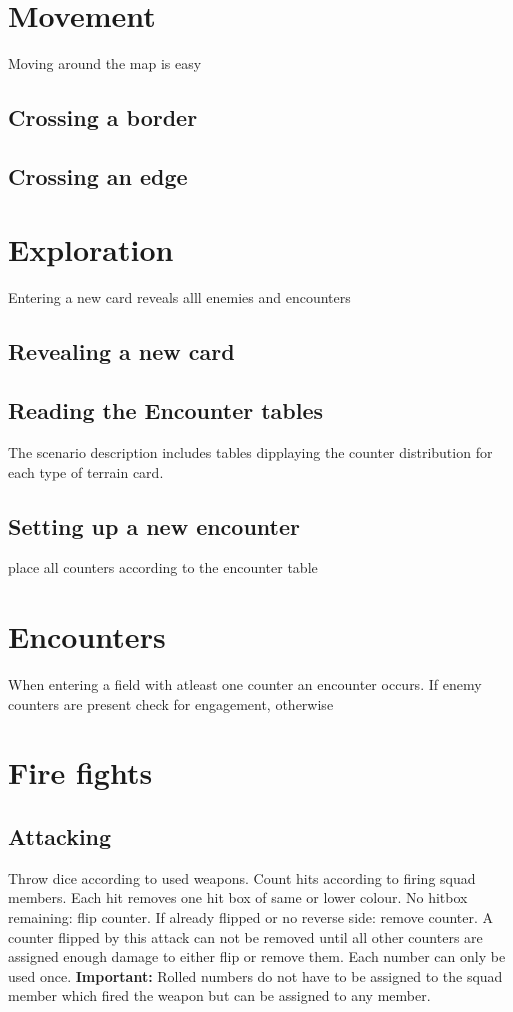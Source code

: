 \documentclass[twocolumn,titlepage]{article}
\begin{document}
\section{Movement}
Moving around the map is easy
\subsection{Crossing a border}
\subsection{Crossing an edge}
\section{Exploration}
Entering a new card reveals alll enemies and encounters
\subsection{Revealing a new card}
\subsection{Reading the Encounter tables}
The scenario description includes tables dipplaying the counter distribution for each type of terrain card.
\subsection{Setting up a new encounter}
place all counters according to the encounter table
\section{Encounters}
When entering a field with atleast one counter an encounter occurs. If enemy counters are present check for engagement, otherwise 
\section{Fire fights}
\subsection{Attacking}
Throw dice according to used weapons. Count hits according to firing squad members. Each hit removes one hit box of same or lower colour. No hitbox remaining: flip counter. If already flipped or no reverse side: remove counter. A counter flipped by this attack can not be removed until all other counters are assigned enough damage to either flip or remove them. Each number can only be used once. {\bf Important:} Rolled numbers do not have to be assigned to the squad member which fired the weapon but can be assigned to any member.
\end{document}
